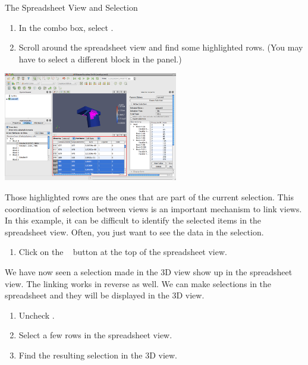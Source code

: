 \begin{exercise}{The Spreadsheet View and Selection}
  \begin{enumerate}
    \restorecounter
  \item In the  combo box, select .
  \item Scroll around the spreadsheet view and find some highlighted rows.
    (You may have to select a different block in the  panel.)
    \savecounter
  \end{enumerate}

  \begin{inlinefig}
    \includegraphics[width=3in]{images/SpreadsheetViewExample}
  \end{inlinefig}

  Those highlighted rows are the ones that are part of the current
  selection.  This coordination of selection between views is an important
  mechanism to link views.  In this example, it can be difficult to identify
  the selected items in the spreadsheet view.  Often, you just want to see
  the data in the selection.

  \begin{enumerate}
    \restorecounter
  \item Click on the ~
    button at the top of the spreadsheet view.
    \savecounter
  \end{enumerate}

  We have now seen a selection made in the 3D view show up in the
  spreadsheet view.  The linking works in reverse as well.  We can make
  selections in the spreadsheet and they will be displayed in the 3D view.

  \begin{enumerate}
  \item Uncheck .
  \item Select a few rows in the spreadsheet view.
  \item Find the resulting selection in the 3D view.
  \end{enumerate}
\end{exercise}

